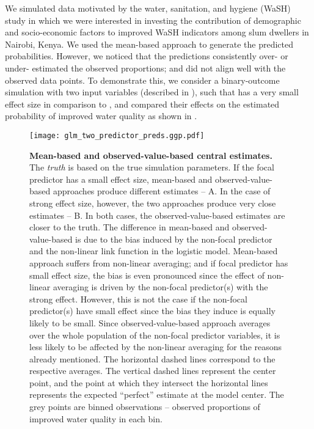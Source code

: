 We simulated data motivated by the water, sanitation, and hygiene (WaSH) study in which we were interested in investing the contribution of demographic and socio-economic factors to improved WaSH indicators among slum dwellers in Nairobi, Kenya. We used the mean-based approach to generate the predicted probabilities. However, we noticed that the predictions consistently over- or under- estimated the observed proportions; and did not align well with the observed data points. To demonstrate this, we consider a binary-outcome simulation with two input variables (described in ), such that  has a very small effect size in comparison to , and compared their effects on the estimated probability of improved water quality as shown in .
%
\begin{figure}
\begin{center}
\texttt{[image: glm\_two\_predictor\_preds.ggp.pdf]}
\end{center}
\caption{{\bf Mean-based and observed-value-based central estimates.} The \emph{truth} is based on the true simulation parameters. If the focal predictor has a small effect size, mean-based and observed-value-based approaches produce different estimates -- A. In the case of strong effect size, however, the two approaches produce very close estimates -- B. In both cases, the observed-value-based estimates are closer to the truth. The difference in mean-based and observed-value-based is due to the bias induced by the non-focal predictor and the non-linear link function in the logistic model. Mean-based approach suffers from non-linear averaging; and if focal predictor has small effect size, the bias is even pronounced since the effect of non-linear averaging is driven by the non-focal predictor(s) with the strong effect. However, this is not the case if the non-focal predictor(s) have small effect since the bias they induce is equally likely to be small. Since observed-value-based approach averages over the whole population of the non-focal predictor variables, it is less likely to be affected by the non-linear averaging for the reasons already mentioned. The horizontal dashed lines correspond to the respective averages. The vertical dashed lines represent the center point, and the point at which they intersect the horizontal lines represents the expected ``perfect'' estimate at the model center. The grey points are binned observations -- observed proportions of improved water quality in each bin.} 
\label{fig:pred_bin_plots}
\end{figure}

